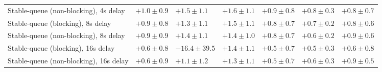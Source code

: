\begin{table}[H]
{\begin{tabular}{l w{c}{5.0em} w{c}{5.0em} w{c}{5.0em} w{c}{5.0em} w{c}{5.0em} w{c}{5.0em}}
Stable-queue (non-blocking), 4s delay & $+1.0\pm0.9$ & $+1.5\pm1.1$ & $+1.6\pm1.1$ & $+0.9\pm0.8$ & $+0.8\pm0.3$ & $+0.8\pm0.7$ \\
Stable-queue (blocking), 8s delay & $+0.9\pm0.8$ & $+1.3\pm1.1$ & $+1.5\pm1.1$ & $+0.8\pm0.7$ & $+0.7\pm0.2$ & $+0.8\pm0.6$ \\
Stable-queue (non-blocking), 8s delay & $+0.9\pm0.9$ & $+1.4\pm1.1$ & $+1.4\pm1.0$ & $+0.8\pm0.7$ & $+0.6\pm0.2$ & $+0.9\pm0.6$ \\
Stable-queue (blocking), 16s delay & $+0.6\pm0.8$ & $-16.4\pm39.5$ & $+1.4\pm1.1$ & $+0.5\pm0.7$ & $+0.5\pm0.3$ & $+0.6\pm0.8$ \\
Stable-queue (non-blocking), 16s delay & $+0.6\pm0.9$ & $+1.1\pm1.2$ & $+1.3\pm1.1$ & $+0.5\pm0.7$ & $+0.6\pm0.3$ & $+0.9\pm0.5$ \\
\bottomrule
\end{tabular}%
}
\end{table}

